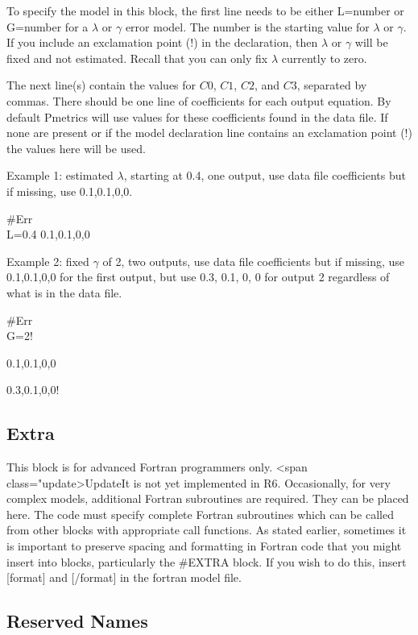 \documentclass[
]{book}
\begin{document}
To specify the model in this block, the first line needs to be either
L=number or G=number for a \(\lambda\) or \(\gamma\) error model. The
number is the starting value for \(\lambda\) or \(\gamma\). If you include an exclamation point (!) in the declaration,
then \(\lambda\) or \(\gamma\) will be fixed and not estimated. Recall that you can
only fix \(\lambda\) currently to zero.

The next line(s) contain the values for \(C0\), \(C1\), \(C2\), and \(C3\),
separated by commas. There should be one line of coefficients for each
output equation. By default Pmetrics will use values for these
coefficients found in the data file. If none are present or if the model
declaration line contains an exclamation point (!) the values here will
be used.

Example 1: estimated \(\lambda\), starting at 0.4, one output, use data file
coefficients but if missing, use 0.1,0.1,0,0.

\#Err\\
L=0.4
0.1,0.1,0,0

Example 2: fixed \(\gamma\) of 2, two outputs, use data file coefficients but
if missing, use 0.1,0.1,0,0 for the first output, but use 0.3, 0.1, 0, 0
for output 2 regardless of what is in the data file.

\#Err\\
G=2!

0.1,0.1,0,0

0.3,0.1,0,0!

\hypertarget{extra}{%
\subsection{Extra}\label{extra}}

This block is for advanced Fortran programmers only.
\textless span class="update\textgreater UpdateIt is not yet implemented in R6.
Occasionally, for very complex models, additional Fortran subroutines are required. They can be placed here. The code must specify complete Fortran subroutines
which can be called from other blocks with appropriate call functions.
As stated earlier, sometimes it is important to preserve spacing and
formatting in Fortran code that you might insert into blocks,
particularly the \#EXTRA block. If you wish to do this, insert {[}format{]} and {[}/format{]} in the fortran model file.

\hypertarget{reserved}{%
\subsection{Reserved Names}\label{reserved}}
\end{document}
